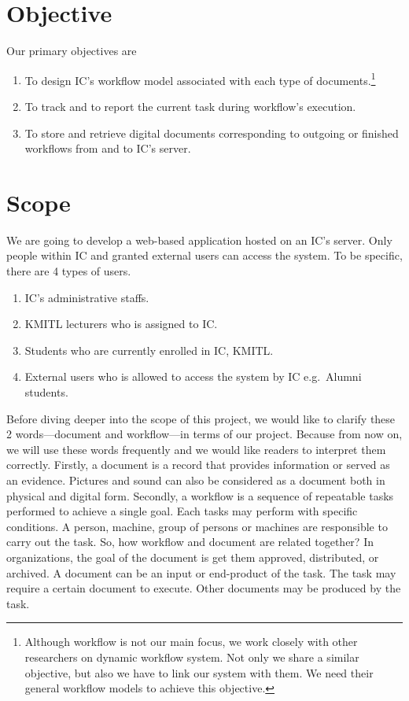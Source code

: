 \section{Objective}
Our primary objectives are
\begin{enumerate}
\item To design IC's workflow model associated with each type of documents.\footnote{
	Although workflow is not our main focus, we work closely with other researchers on dynamic workflow system. %
	Not only we share a similar objective, but also we have to link our system with them.
	We need their general workflow models to achieve this objective.
	}
\item To track and to report the current task during workflow's execution.
\item To store and retrieve digital documents corresponding to outgoing or finished workflows from and to IC's server.
\end{enumerate}

\section{Scope}
We are going to develop a web-based application hosted on an IC's server.
Only people within IC and granted external users can access the system.
To be specific, there are 4 types of users.
\begin{enumerate}
\item IC's administrative staffs.
\item KMITL lecturers who is assigned to IC.
\item Students who are currently enrolled in IC, KMITL.
\item External users who is allowed to access the system by IC e.g.\ Alumni students.
\end{enumerate}

Before diving deeper into the scope of this project, we would like to clarify these 2 words---document and workflow---in terms of our project. %
Because from now on, we will use these words frequently and we would like readers to interpret them correctly.
Firstly, a document is a record that provides information or served as an evidence.
Pictures and sound can also be considered as a document both in physical and digital form. %
Secondly, a workflow is a sequence of repeatable tasks performed to achieve a single goal. %
Each tasks may perform with specific conditions.
A person, machine, group of persons or machines are responsible to carry out the task. %
So, how workflow and document are related together?
In organizations, the goal of the document is get them approved, distributed, or archived.
A document can be an input or end-product of the task.
The task may require a certain document to execute.
Other documents may be produced by the task.

